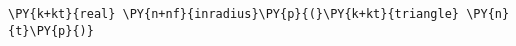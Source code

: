 \begin{Verbatim}[commandchars=\\\{\}]
    \PY{k+kt}{real} \PY{n+nf}{inradius}\PY{p}{(}\PY{k+kt}{triangle} \PY{n}{t}\PY{p}{)}
\end{Verbatim}
